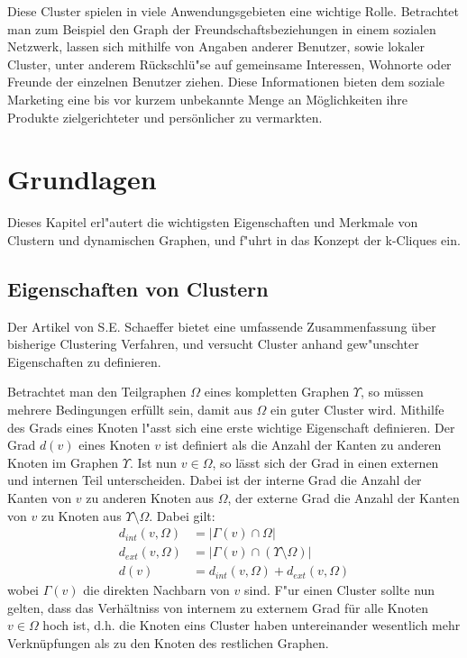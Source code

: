 \documentclass[journal]{vgtc}
\begin{document}
  Diese Cluster spielen in viele Anwendungsgebieten eine wichtige Rolle. 
  Betrachtet man zum Beispiel den Graph der Freundschaftsbeziehungen in einem sozialen Netzwerk,
  lassen sich mithilfe von Angaben anderer Benutzer, sowie lokaler Cluster, unter anderem Rückschlü"se 
  auf gemeinsame Interessen, Wohnorte oder Freunde der einzelnen Benutzer ziehen.
  Diese Informationen bieten dem soziale Marketing eine bis vor kurzem unbekannte Menge
  an Möglichkeiten ihre Produkte zielgerichteter und persönlicher zu vermarkten.

\section{Grundlagen}
  
  Dieses Kapitel erl"autert die wichtigsten Eigenschaften und Merkmale von Clustern und
  dynamischen Graphen, und f"uhrt in das Konzept der k-Cliques ein.
  
  \subsection{Eigenschaften von Clustern}
  \label{sec:properties} 
  Der Artikel von S.E. Schaeffer \cite{Schaeffer} bietet eine umfassende Zusammenfassung
  über bisherige Clustering Verfahren, und versucht Cluster anhand gew"unschter
  Eigenschaften zu definieren.
  
  Betrachtet man den Teilgraphen $\Omega$ eines kompletten Graphen $\Upsilon$, so müssen
  mehrere Bedingungen erfüllt sein, damit aus $\Omega$ ein guter Cluster wird.
  Mithilfe des Grads eines Knoten l"asst sich eine erste wichtige Eigenschaft definieren.
  Der Grad $d(v)$ eines Knoten $v$ ist definiert als die Anzahl der Kanten zu anderen Knoten im
  Graphen $\Upsilon$. Ist nun $v \in \Omega$, so lässt sich der Grad in einen externen und internen Teil unterscheiden. Dabei
  ist der interne Grad die Anzahl der Kanten von $v$ zu anderen Knoten aus $\Omega$, der externe
  Grad die Anzahl der Kanten von $v$ zu Knoten aus $\Upsilon \setminus \Omega$.
  Dabei gilt:
    \begin{align}
      d_{int}(v, \Omega) &= |\Gamma(v) \cap \Omega |\\
      d_{ext}(v, \Omega) &= |\Gamma(v) \cap (\Upsilon \setminus \Omega) | \\
      d(v) &= d_{int}(v, \Omega) + d_{ext}(v, \Omega)
    \end{align}
  wobei $\Gamma(v)$ die direkten Nachbarn von $v$ sind.
  F"ur einen Cluster sollte nun gelten, dass das Verhältniss von internem zu externem Grad für alle Knoten $v \in \Omega$
  hoch ist, d.h. die Knoten eins 
  Cluster haben untereinander wesentlich mehr Verknüpfungen als zu den Knoten des restlichen Graphen.
   
\end{document}
